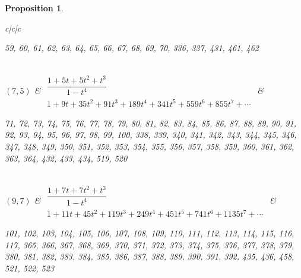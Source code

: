 \documentclass[pdftex]{sigma}%
\newtheorem{prop}[thm]{Proposition}
\theoremstyle{definition}
\numberwithin{equation}{section}
\begin{document}
\begin{prop}
\begin{table}[h!]
\begin{tabu}{c|c|c}
\begin{minipage}{4cm}
 \rm
 	59, 60, 61, 62, 63, 64, 65, 66, 67, 68,
	 69, 70, 336, 337, 431, 461, 462
 \end{minipage}
	\\ \hline
	$(7,5)$\label{T(5,7)}
	&
	$\begin{array}{c}
	 \dfrac{1+5t+5t^2+t^3}{1-t^4} \\[15pt]
	 {1+9t+35t^2+91t^3+189t^4+341t^5+559t^6+855t^7+\cdots}
	\end{array}$
	&
	 \begin{minipage}{4cm}
 \rm
 	71, 72, 73, 74, 75, 76, 77, 78, 79, 80,
	 81, 82, 83, 84, 85, 86, 87, 88, 89, 90,
	 91, 92, 93, 94, 95, 96, 97, 98, 99, 100,
	 338, 339, 340, 341, 342, 343, 344, 345, 346, 347,
	 348, 349, 350, 351, 352, 353, 354, 355, 356, 357,
	 358, 359, 360, 361, 362, 363, 364, 432, 433, 434,
	 519, 520
 \end{minipage}
\\ \hline
	$(9,7)$\label{T(7,9)}
	&
	$\begin{array}{c}
	 \dfrac{1+7t+7t^2+t^3}{1-t^4} \\[15pt]
	 {1+11t+45t^2+119t^3+249t^4+451t^5+741t^6+1135t^7+\cdots}
	\end{array}$
	&
	 \begin{minipage}{4cm}
 \rm
 	101, 102, 103, 104, 105, 106, 107, 108, 109, 110,
	 111, 112, 113, 114, 115, 116, 117, 365, 366, 367,
	 368, 369, 370, 371, 372, 373, 374, 375, 376, 377,
	 378, 379, 380, 381, 382, 383, 384, 385, 386, 387,
	 388, 389, 390, 391, 392, 435, 436, 458, 521, 522,
	 523
 \end{minipage}
 \\
\hline
\end{tabu}%
\end{table}


\end{prop}
\end{document}
